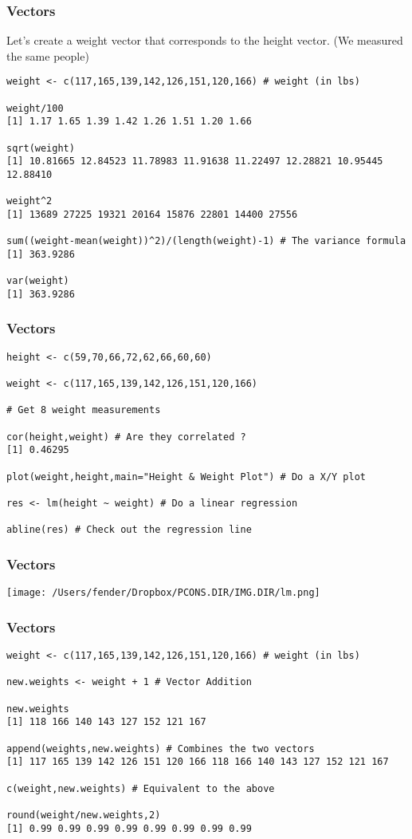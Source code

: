 \documentclass{beamer}
\begin{document}
\begin{frame}[fragile]
\frametitle{Vectors}
Let's create a weight vector that corresponds to the height vector. (We measured the same people)
\newline
\footnotesize
\begin{verbatim}
weight <- c(117,165,139,142,126,151,120,166) # weight (in lbs)

weight/100
[1] 1.17 1.65 1.39 1.42 1.26 1.51 1.20 1.66

sqrt(weight)
[1] 10.81665 12.84523 11.78983 11.91638 11.22497 12.28821 10.95445 12.88410

weight^2
[1] 13689 27225 19321 20164 15876 22801 14400 27556

sum((weight-mean(weight))^2)/(length(weight)-1) # The variance formula
[1] 363.9286

var(weight)
[1] 363.9286
\end{verbatim}
\end{frame}

\begin{frame}[fragile]
\frametitle{Vectors}
\small
\begin{verbatim}
height <- c(59,70,66,72,62,66,60,60)

weight <- c(117,165,139,142,126,151,120,166)

# Get 8 weight measurements

cor(height,weight) # Are they correlated ?
[1] 0.46295

plot(weight,height,main="Height & Weight Plot") # Do a X/Y plot

res <- lm(height ~ weight) # Do a linear regression

abline(res) # Check out the regression line
\end{verbatim}
\end{frame}

\begin{frame}[fragile]
\frametitle{Vectors}
\begin{center}
\texttt{[image: /Users/fender/Dropbox/PCONS.DIR/IMG.DIR/lm.png]}
\end{center}
\end{frame}

\begin{frame}[fragile]
\frametitle{Vectors}
\small
\begin{verbatim}
weight <- c(117,165,139,142,126,151,120,166) # weight (in lbs)

new.weights <- weight + 1 # Vector Addition

new.weights
[1] 118 166 140 143 127 152 121 167

append(weights,new.weights) # Combines the two vectors
[1] 117 165 139 142 126 151 120 166 118 166 140 143 127 152 121 167

c(weight,new.weights) # Equivalent to the above

round(weight/new.weights,2)
[1] 0.99 0.99 0.99 0.99 0.99 0.99 0.99 0.99
\end{verbatim}
\end{frame}
\end{document}
